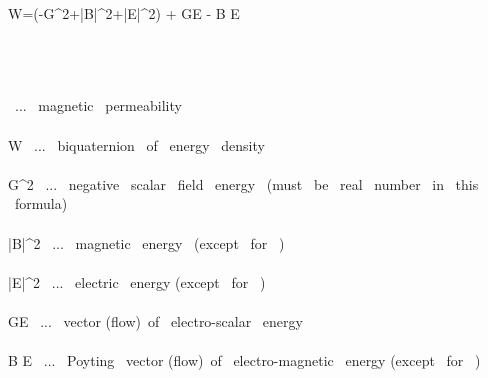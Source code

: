 \mu  \widehat W=(-G^2+|\vec B|^2+|\vec E|^2) +\imath {} G\vec E - \imath {} \vec B \times \vec E \\\\\\

\

\mu \ ... \ magnetic \ permeability \\\\
\widehat W \ ... \ biquaternion \ of \ energy \ density \\\\
G^2 \ ... \  negative \ scalar \ field \ energy \ (must \ be \ real \ number \ in \ this \  formula)\\\\
|\vec B|^2 \ ... \ magnetic \ energy \ (except \ for \ \mu) \\\\
|\vec E|^2 \ ... \ electric \ energy (except \ for \ \mu) \\\\
 G\vec E \ ... \ vector (flow)\ of \ electro-scalar \ energy \\\\
 \vec B \times \vec E \ ... \ Poyting \ vector (flow)\ of \ electro-magnetic \ energy (except \ for \ \mu)
